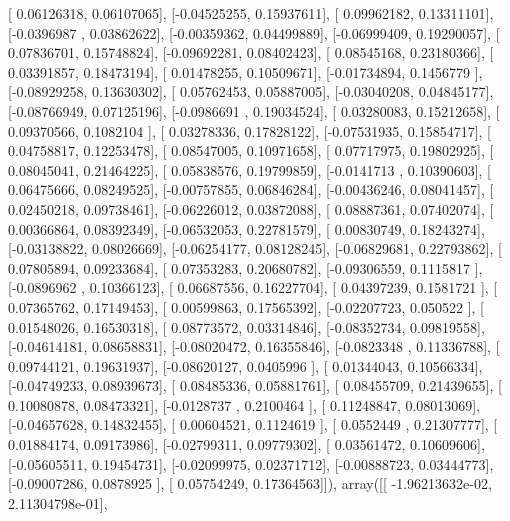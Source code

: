 \documentclass{article}
\begin{document}
       [ 0.06126318,  0.06107065],
       [-0.04525255,  0.15937611],
       [ 0.09962182,  0.13311101],
       [-0.0396987 ,  0.03862622],
       [-0.00359362,  0.04499889],
       [-0.06999409,  0.19290057],
       [ 0.07836701,  0.15748824],
       [-0.09692281,  0.08402423],
       [ 0.08545168,  0.23180366],
       [ 0.03391857,  0.18473194],
       [ 0.01478255,  0.10509671],
       [-0.01734894,  0.1456779 ],
       [-0.08929258,  0.13630302],
       [ 0.05762453,  0.05887005],
       [-0.03040208,  0.04845177],
       [-0.08766949,  0.07125196],
       [-0.0986691 ,  0.19034524],
       [ 0.03280083,  0.15212658],
       [ 0.09370566,  0.1082104 ],
       [ 0.03278336,  0.17828122],
       [-0.07531935,  0.15854717],
       [ 0.04758817,  0.12253478],
       [ 0.08547005,  0.10971658],
       [ 0.07717975,  0.19802925],
       [ 0.08045041,  0.21464225],
       [ 0.05838576,  0.19799859],
       [-0.0141713 ,  0.10390603],
       [ 0.06475666,  0.08249525],
       [-0.00757855,  0.06846284],
       [-0.00436246,  0.08041457],
       [ 0.02450218,  0.09738461],
       [-0.06226012,  0.03872088],
       [ 0.08887361,  0.07402074],
       [ 0.00366864,  0.08392349],
       [-0.06532053,  0.22781579],
       [ 0.00830749,  0.18243274],
       [-0.03138822,  0.08026669],
       [-0.06254177,  0.08128245],
       [-0.06829681,  0.22793862],
       [ 0.07805894,  0.09233684],
       [ 0.07353283,  0.20680782],
       [-0.09306559,  0.1115817 ],
       [-0.0896962 ,  0.10366123],
       [ 0.06687556,  0.16227704],
       [ 0.04397239,  0.1581721 ],
       [ 0.07365762,  0.17149453],
       [ 0.00599863,  0.17565392],
       [-0.02207723,  0.050522  ],
       [ 0.01548026,  0.16530318],
       [ 0.08773572,  0.03314846],
       [-0.08352734,  0.09819558],
       [-0.04614181,  0.08658831],
       [-0.08020472,  0.16355846],
       [-0.0823348 ,  0.11336788],
       [ 0.09744121,  0.19631937],
       [-0.08620127,  0.0405996 ],
       [ 0.01344043,  0.10566334],
       [-0.04749233,  0.08939673],
       [ 0.08485336,  0.05881761],
       [ 0.08455709,  0.21439655],
       [ 0.10080878,  0.08473321],
       [-0.0128737 ,  0.2100464 ],
       [ 0.11248847,  0.08013069],
       [-0.04657628,  0.14832455],
       [ 0.00604521,  0.1124619 ],
       [ 0.0552449 ,  0.21307777],
       [ 0.01884174,  0.09173986],
       [-0.02799311,  0.09779302],
       [ 0.03561472,  0.10609606],
       [-0.05605511,  0.19454731],
       [-0.02099975,  0.02371712],
       [-0.00888723,  0.03444773],
       [-0.09007286,  0.0878925 ],
       [ 0.05754249,  0.17364563]]), array([[ -1.96213632e-02,   2.11304798e-01],
\end{document}
